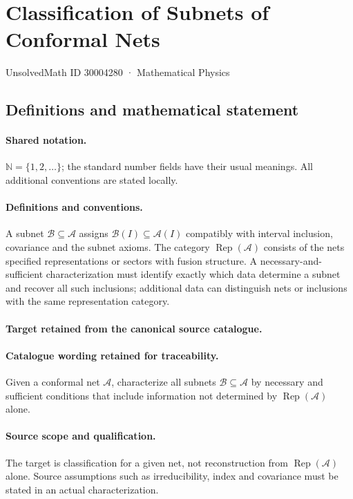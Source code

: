 \documentclass[11pt]{article}
\begin{document}
\setcounter{section}{30004279}
\section{Classification of Subnets of Conformal Nets}\label{30004280}
{\small UnsolvedMath ID 30004280 · Mathematical Physics}
\subsection{Definitions and mathematical statement}

\paragraph{Shared notation.}$\mathbb N=\{1,2,\ldots\}$; the standard number fields have their usual meanings. All additional conventions are stated locally.


\paragraph{Definitions and conventions.}
A subnet $\mathcal B\subseteq\mathcal A$ assigns $\mathcal B(I)\subseteq\mathcal A(I)$ compatibly with interval inclusion, covariance and the subnet axioms. The category $\operatorname{Rep}(\mathcal A)$ consists of the net\textquotesingle s specified representations or sectors with fusion structure. A necessary-and-sufficient characterization must identify exactly which data determine a subnet and recover all such inclusions; additional data can distinguish nets or inclusions with the same representation category.

\paragraph{Target retained from the canonical source catalogue.}
\paragraph{Catalogue wording retained for traceability.}
Given a conformal net $\mathcal A$, characterize all subnets $\mathcal B\subseteq\mathcal A$ by necessary and sufficient conditions that include information not determined by $\operatorname{Rep}(\mathcal A)$ alone.

\paragraph{Source scope and qualification.}
The target is classification for a given net, not reconstruction from $\operatorname{Rep}(\mathcal A)$ alone. Source assumptions such as irreducibility, index and covariance must be stated in an actual characterization.
\end{document}
